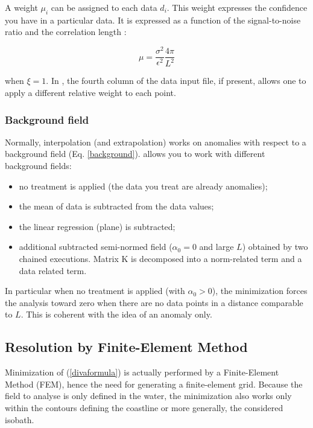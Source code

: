 A weight $\mu_i$ can be assigned to each data $d_i$. This weight expresses the confidence you have in a particular data. It is expressed as a function of the signal-to-noise ratio and the correlation length \cite{BRANKART96}: 

\begin{equation}
\mu=\frac{\sigma^{2}}{\epsilon^{2}} \frac{4 \pi}{L^{2}}
\end{equation}


when $\xi=1$. In  \diva, the fourth column of the data input file, if present, allows one 
to apply a different relative weight to each point. 


\subsubsection{Background field\label{sec:backgroundfield}}

Normally, interpolation (and extrapolation) works on anomalies with respect to a background field (Eq. \ref{background}). \diva allows you to work with different background fields:

\begin{itemize}
\item no treatment is applied (the data you treat are already anomalies);
\item the mean of data is subtracted from the data values;
\item the linear regression (plane) is subtracted;
\item additional subtracted semi-normed field ($\alpha_0=0$ and large $L$) obtained by two chained \diva executions. Matrix K is decomposed into a norm-related term and a data related term.
\end{itemize}

In particular when no treatment is applied (with $\alpha_0 > 0$), the minimization forces the analysis toward zero when there are no
data points in a distance comparable to $L$. This is coherent with the idea of an anomaly only.

\subsection{Resolution by Finite-Element Method}

Minimization of (\ref{divaformula}) is actually performed by a Finite-Element Method (FEM), hence the need for generating a finite-element grid. 
Because the field to analyse is only defined in the water, the minimization also works only within the contours defining the coastline or more generally, the considered isobath.

